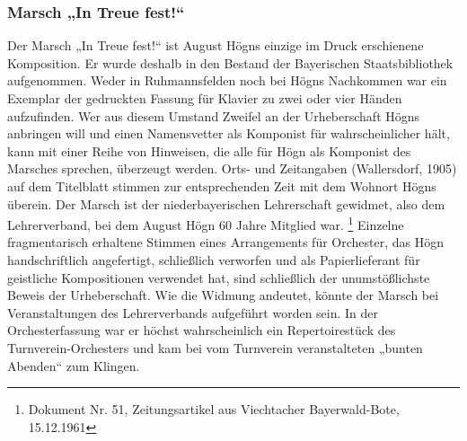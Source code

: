 \documentclass[a4paper]{article}
\begin{document}
\subsubsection{Marsch „In Treue fest!“}
\hypertarget{RefHeadingToc100333754}{} Der Marsch „In Treue fest!“ ist
August Högns einzige im Druck erschienene Komposition. Er wurde deshalb
in den Bestand der Bayerischen Staatsbibliothek aufgenommen. Weder in
Ruhmannsfelden noch bei Högns Nachkommen war ein Exemplar der
gedruckten Fassung für Klavier zu zwei oder vier Händen aufzufinden.
Wer aus diesem Umstand Zweifel an der Urheberschaft Högns anbringen
will und einen Namensvetter als Komponist für wahrscheinlicher hält,
kann mit einer Reihe von Hinweisen, die alle für Högn als Komponist des
Marsches sprechen, überzeugt werden. Orts- und Zeitangaben
(Wallersdorf, 1905) auf dem Titelblatt stimmen zur entsprechenden Zeit
mit dem Wohnort Högns überein. Der Marsch ist der niederbayerischen
Lehrerschaft gewidmet, also dem Lehrerverband, bei dem August Högn 60
Jahre Mitglied war. \footnote{Dokument Nr. 51, Zeitungsartikel aus
Viechtacher Bayerwald-Bote, 15.12.1961} Einzelne fragmentarisch
erhaltene Stimmen eines Arrangements für Orchester, das Högn
handschriftlich angefertigt, schließlich verworfen und als
Papierlieferant für geistliche Kompositionen verwendet hat, sind
schließlich der unumstößlichste Beweis der Urheberschaft. Wie die
Widmung andeutet, könnte der Marsch bei Veranstaltungen des
Lehrerverbands aufgeführt worden sein. In der Orchesterfassung war er
höchst wahrscheinlich ein Repertoirestück des Turnverein-Orchesters und
kam bei vom Turnverein veranstalteten „bunten Abenden“ zum Klingen.
\end{document}
